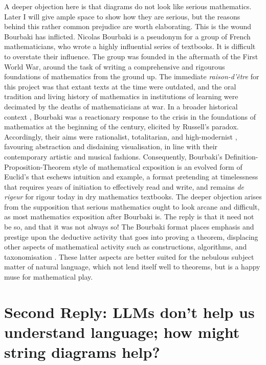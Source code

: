 \begin{fullwidth}
\begin{multicols}{2}
A deeper objection here is that diagrams do not look like serious mathematics. Later I will give ample space to show how they are serious, but the reasons behind this rather common prejudice are worth elaborating. This is the wound Bourbaki has inflicted. Nicolas Bourbaki is a pseudonym for a group of French mathematicians, who wrote a highly influential series of textbooks. It is difficult to overstate their influence. The group was founded in the aftermath of the First World War, around the task of writing a comprehensive and rigourous foundations of mathematics from the ground up. The immediate \emph{raison-d'\^{e}tre} for this project was that extant texts at the time were outdated, and the oral tradition and living history of mathematics in institutions of learning were decimated by the deaths of mathematicians at war. In a broader historical context \citep{}, Bourbaki was a reactionary response to the crisis in the foundations of mathematics at the beginning of the century, elicited by Russell's paradox. Accordingly, their aims were rationalist, totalitarian, and high-modernist \citep{}, favouring abstraction and disdaining visualisation, in line with their contemporary artistic and musical fashions. Consequently, Bourbaki's Definition-Proposition-Theorem style of mathematical exposition is an evolved form of Euclid's that eschews intuition and example, a format pretending at timelessness that requires years of initiation to effectively read and write, and remains \emph{de rigeur} for rigour today in dry mathematics textbooks. The deeper objection arises from the supposition that serious mathematics ought to look arcane and difficult, as most mathematics exposition after Bourbaki is. The reply is that it need not be so, and that it was not always so! The Bourbaki format places emphasis and prestige upon the deductive activity that goes into proving a theorem, displacing other aspects of mathematical activity such as constructions, algorithms, and taxonomisation \citep{}. These latter aspects are better suited for the nebulous subject matter of natural language, which not lend itself well to theorems, but is a happy muse for mathematical play.

\section{\textbf{Second Reply:} LLMs don't help us understand language; how might string diagrams help?}


\end{multicols}
\end{fullwidth}
